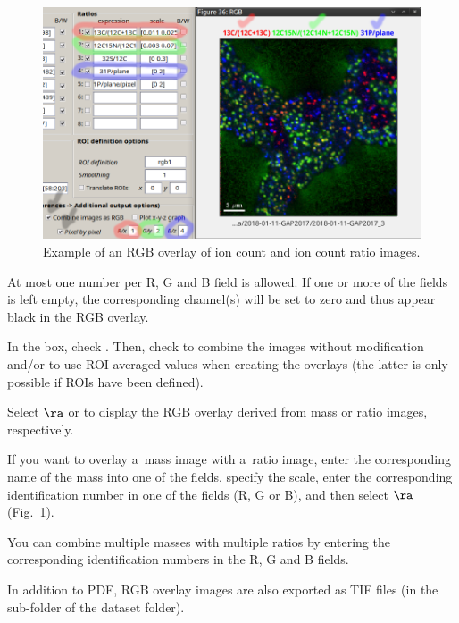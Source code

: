 \begin{figure}[!ht]
\centering
\includegraphics[scale=0.35]{figs3/LANS-rgb-overlay}
\caption{\label{fig:rgb-overlay}%
Example of an RGB overlay of ion count and ion count ratio images.}
\end{figure}

\bul At most one number per R, G and B field is allowed. If one or more of the fields is left empty, the corresponding channel(s) will be set to zero and thus appear black in the RGB overlay.

\s In the  box, check . Then, check  to combine the images without modification and/or  to use ROI-averaged values when creating the overlays (the latter is only possible if ROIs have been defined).

\s Select  $\ra$  or  to display the RGB overlay derived from mass or ratio images, respectively.

\bul If you want to overlay a~mass image with a~ratio image, enter the corresponding name of the mass into one of the  fields, specify the scale, enter the corresponding identification number in one of the  fields (R, G or B), and then select  $\ra$  (Fig.~\ref{fig:rgb-overlay}). 

\bul You can combine multiple masses with multiple ratios by entering the corresponding identification numbers in the R, G and B fields.

\bul In addition to PDF, RGB overlay images are also exported as TIF files (in the  sub-folder of the dataset folder).


